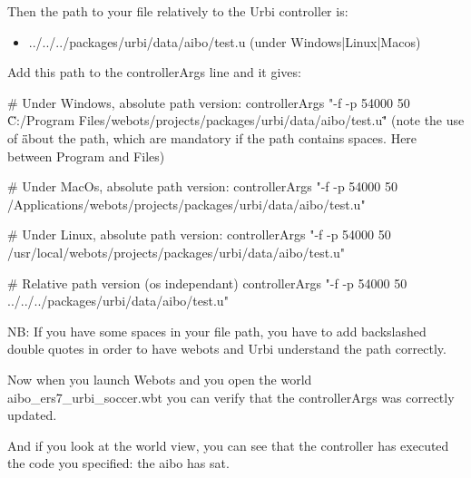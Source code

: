        Then the path to your file relatively to the Urbi controller is:
 \begin{itemize}

\item   ../../../packages/urbi/data/aibo/test.u (under Windows|Linux|Macos)


\end{itemize}
         Add this path to the controllerArgs line and it gives:


\begin{shell}
# Under Windows, absolute path version:
controllerArgs "-f -p 54000 50 \"C:/Program Files/webots/projects/packages/urbi/data/aibo/test.u\""
(note the use of \" \" about the path, which are mandatory if the path
contains spaces. Here between Program and Files)

# Under MacOs, absolute path version:
controllerArgs "-f -p 54000 50 /Applications/webots/projects/packages/urbi/data/aibo/test.u"

# Under Linux, absolute path version:
controllerArgs "-f -p 54000 50 /usr/local/webots/projects/packages/urbi/data/aibo/test.u"

# Relative path version (os independant)
controllerArgs "-f -p 54000 50 ../../../packages/urbi/data/aibo/test.u"
\end{shell}

NB: If you have some spaces in your file path, you have to add
backslashed double quotes in order to have webots and Urbi understand
the path correctly.


Now when you launch Webots and you open the world
aibo\_ers7\_urbi\_soccer.wbt you can verify that the controllerArgs
was correctly updated.




And if you look at the world view, you can see that the controller has
executed the \urbi code you specified: the aibo has sat.




